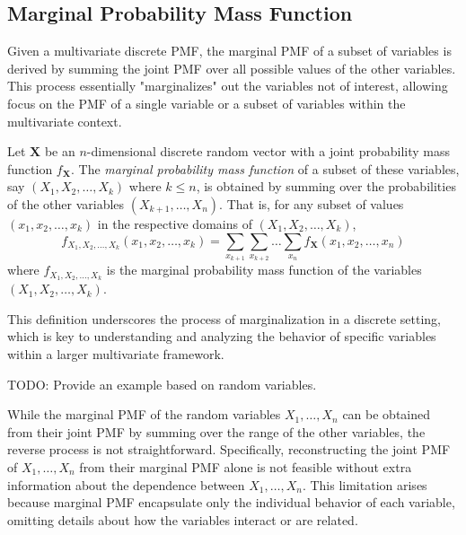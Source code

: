 
\subsection*{Marginal Probability Mass Function}

Given a multivariate discrete PMF, the marginal PMF of a subset of variables is derived by summing the joint PMF over all possible values of the other variables. This process essentially "marginalizes" out the variables not of interest, allowing focus on the PMF of a single variable or a subset of variables within the multivariate context.

\begin{definition}
Let $\mathbf{X}$ be an $n$-dimensional discrete random vector with a joint probability mass function $f_\mathbf{X}$. The \emph{marginal probability mass function} of a subset of these variables, say $(X_1, X_2, \ldots, X_k)$ where $k \leq n$, is obtained by summing over the probabilities of the other variables $(X_{k+1}, \ldots, X_n)$. That is, for any subset of values $(x_1, x_2, \ldots, x_k)$ in the respective domains of $(X_1, X_2, \ldots, X_k)$,
\[
f_{X_1, X_2, \ldots, X_k}(x_1, x_2, \ldots, x_k) = \sum_{x_{k+1}} \sum_{x_{k+2}} \ldots \sum_{x_n} f_\mathbf{X}(x_1, x_2, \ldots, x_n)
\]
where $f_{X_1, X_2, \ldots, X_k}$ is the marginal probability mass function of the variables $(X_1, X_2, \ldots, X_k)$.
\end{definition}

This definition underscores the process of marginalization in a discrete setting, which is key to understanding and analyzing the behavior of specific variables within a larger multivariate framework.

\begin{example}
{\color{red} TODO: Provide an example based on random variables.}
\end{example}

While the marginal PMF of the random variables $X_1, \ldots, X_n$ can be obtained from their joint PMF by summing over the range of the other variables, the reverse process is not straightforward. Specifically, reconstructing the joint PMF of $X_1, \ldots, X_n$ from their marginal PMF alone is not feasible without extra information about the dependence between $X_1, \ldots, X_n$. This limitation arises because marginal PMF encapsulate only the individual behavior of each variable, omitting details about how the variables interact or are related.

